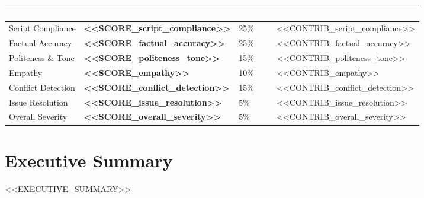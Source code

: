 \documentclass[12pt,a4paper]{article}
\begin{document}
\begin{center}
\begin{tabular}{lC{1.6cm}C{1.6cm}C{2cm}}
\toprule
{}
\textcolor{white}{\textbf{Criterion}} &
\textcolor{white}{\textbf{Score}} &
\textcolor{white}{\textbf{Weight}} &
\textcolor{white}{\textbf{Contribution}} \\
\midrule
{}
Script Compliance      & \textcolor{<<COLOR_script_compliance>>}{\textbf{<<SCORE_script_compliance>>}}     & 25\% & <<CONTRIB_script_compliance>> \\
Factual Accuracy       & \textcolor{<<COLOR_factual_accuracy>>}{\textbf{<<SCORE_factual_accuracy>>}}       & 25\% & <<CONTRIB_factual_accuracy>> \\
Politeness \& Tone     & \textcolor{<<COLOR_politeness_tone>>}{\textbf{<<SCORE_politeness_tone>>}}         & 15\% & <<CONTRIB_politeness_tone>> \\
Empathy                & \textcolor{<<COLOR_empathy>>}{\textbf{<<SCORE_empathy>>}}                         & 10\% & <<CONTRIB_empathy>> \\
Conflict Detection     & \textcolor{<<COLOR_conflict_detection>>}{\textbf{<<SCORE_conflict_detection>>}}   & 15\% & <<CONTRIB_conflict_detection>> \\
Issue Resolution       & \textcolor{<<COLOR_issue_resolution>>}{\textbf{<<SCORE_issue_resolution>>}}       & 5\%  & <<CONTRIB_issue_resolution>> \\
Overall Severity       & \textcolor{<<COLOR_overall_severity>>}{\textbf{<<SCORE_overall_severity>>}}       & 5\%  & <<CONTRIB_overall_severity>> \\
\bottomrule
\end{tabular}
\end{center}

\vspace{1.2em}

\section{Executive Summary}

<<EXECUTIVE_SUMMARY>>

\vspace{0.5em}

\end{document}
